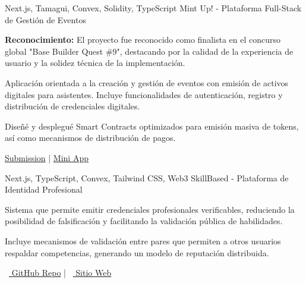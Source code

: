 

\begin{cventries}

  \cventry
    {Next.js, Tamagui, Convex, Solidity, TypeScript} %
    {Mint Up! - Plataforma Full-Stack de Gestión de Eventos} %
    {} %
    {} %
    {
      \begin{cvitems} %
        \item {\textbf{Reconocimiento:} El proyecto fue reconocido como finalista en el concurso global "Base Builder Quest \#9", destacando por la calidad de la experiencia de usuario y la solidez técnica de la implementación.}
        \item {Aplicación orientada a la creación y gestión de eventos con emisión de activos digitales para asistentes. Incluye funcionalidades de autenticación, registro y distribución de credenciales digitales.}
        \item {Diseñé y desplegué Smart Contracts optimizados para emisión masiva de tokens, así como mecanismos de distribución de pagos.}
        \item {\faLink \href{https://devfolio.co/projects/mint-up-5d5d}{ Submission} \quad | \quad \faLink \href{https://farcaster.xyz/miniapps/jkuOonikCzn7/mint-up}{ Mini App}}
      \end{cvitems}
    }

  \vspace{6mm}

  \cventry
    {Next.js, TypeScript, Convex, Tailwind CSS, Web3} %
    {SkillBased - Plataforma de Identidad Profesional} %
    {} %
    {} %
    {
      \begin{cvitems} %
        \item {Sistema que permite emitir credenciales profesionales verificables, reduciendo la posibilidad de falsificación y facilitando la validación pública de habilidades.}
        \item {Incluye mecanismos de validación entre pares que permiten a otros usuarios respaldar competencias, generando un modelo de reputación distribuida.}
        \item {\faGithub\ \href{https://github.com/mavix21/SkillBased}{ GitHub Repo} \quad | \quad \faLink\ \href{https://skill-based.vercel.app/}{ Sitio Web}}
      \end{cvitems}
    }


\end{cventries}
